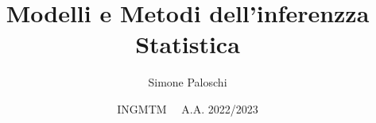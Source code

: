 \usepackage{hyperref}
\usepackage[utf8]{inputenc}
\usepackage{amsfonts}
\usepackage{amsmath}
\usepackage{amssymb}
\usepackage{dsfont} %
\usepackage{tikz}
\usepackage{bbm}
\usepackage{relsize}
\usepackage{pgfplots}
\pgfplotsset{compat=1.18}
\usepackage{scalerel}
\usepackage{wrapfig}
\usepackage[T1]{fontenc}       %
\usepackage[framed,numbered]{matlab-prettifier}


\setlength{\parindent}{0cm} 

\setlength{\footskip}{1.3cm}


\usepackage[
	left=2.5cm, %
	right=2.5cm, %
	top=2.3cm,
	bottom=2.8cm,
	]{geometry}



\graphicspath{ {./images/} }


\renewcommand{\contentsname}{Indice}



\title{Modelli e Metodi dell'inferenzza Statistica}
\author{Simone Paloschi}
\date{INGMTM \ \ A.A. 2022/2023}
\linespread{1.5}

\DeclareRobustCommand{\Chi}{{\mathpalette\irchi\relax}}
\newcommand{\irchi}[2]{\raisebox{\depth}{$#1\chi$}} %


\newcommand{\EE}{\mathbb E}
\newcommand{\NN}{\mathbb N}
\newcommand{\PP}{\mathbb P}
\newcommand{\R}{\mathbb R}
\newcommand{\ZZ}{\mathbb Z}

\newcommand{\Ac}{\mathcal A}
\newcommand{\Bc}{\mathcal B}
\newcommand{\Cc}{\mathcal C}
\newcommand{\Ec}{\mathcal E}
\newcommand{\Fc}{\mathcal F}
\newcommand{\Gc}{\mathcal G}
\newcommand{\Hc}{\mathcal H}
\newcommand{\Lc}{\mathcal L}
\newcommand{\Nc}{\mathcal N}
\newcommand{\Pc}{\mathcal P}
\newcommand{\Uc}{\mathcal U}
\newcommand{\Vc}{\mathcal V}


\usepackage{esvect}


\newcommand{\eps}{\varepsilon}




\renewcommand{\frac}{\dfrac}

\let \INT \int 
\renewcommand{\int}{\displaystyle\INT}


\newcommand{\ind}{\perp \!\!\! \perp} %

\newcommand{\Sum}[2]{\sum\limits_{#1}^{#2}} 

